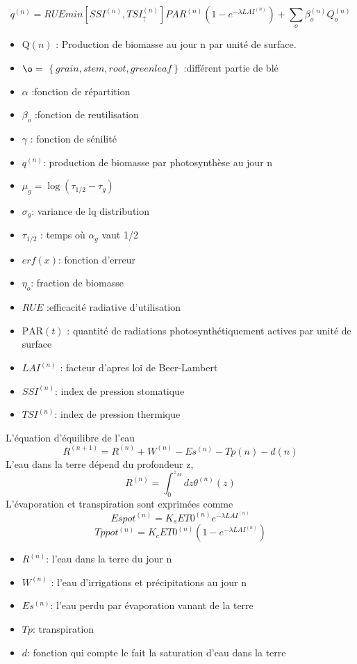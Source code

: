 \[ {q^{(n)}}=RUE min[SSI^{(n)}, TSI_\uparrow^{(n)}]PAR^{(n)}(1-e^{-\lambda LAI^{(n)}})+\sum_o \beta_o^{(n)}Q_o^{(n)} \]
\begin{itemize}
\item $\mathrm{Q}(n)$ : Production de biomasse au jour n par unité de surface.
\item $\o=$ $\left\lbrace grain, stem,root,greenleaf\right\rbrace$ :différent partie de blé
\item $\alpha$  :fonction de répartition
\item $\beta_o$  :fonction de reutilisation
\item $\gamma$ : fonction de sénilité
\item $q^{(n)}$: production de biomasse par photosynthèse au jour n 
\item $\mu_g=\log (\tau_{1/2}-\tau_g)$
\item $\sigma_g$: variance de lq distribution
\item $\tau_{1/2}$ : temps où $\alpha_g$ vaut 1/2
\item $erf(x)$: fonction d'erreur
\item $\eta_o$: fraction de biomasse 
\item $RUE$ :efficacité radiative d'utilisation 
\item $\mathrm{PAR}(t)$ : quantité de radiations photosynthétiquement actives par unité de surface
\item $LAI^{(n)}$ : facteur d'apres loi de Beer-Lambert 
\item $SSI^{(n)}$: index de pression stomatique 
\item $TSI^{(n)}$: index de pression thermique
\end{itemize}
L'équation d'équilibre de l'eau
\[ {R^{(n+1)}}=R^{(n)}+W^{(n)}-Es^{(n)}-Tp{(n)}-d{(n)}\]
L'eau dans la terre dépend du profondeur z,
\[ {R^{(n)}}=\int_0^{z_M}dz \theta^{(n)}(z) \]
L'évaporation et transpiration sont exprimées comme
\[ {Espot^{(n)}}=K_sET0^{(n)}e^{-\lambda LAI^{(n)}}\]
\[ {Tppot^{(n)}}=K_cET0^{(n)}(1-e^{-\lambda LAI^{(n)}})\]
\begin{itemize}
\item $R^{(n)}$: l'eau dans la terre du jour n
\item $W^{(n)}$ : l'eau d'irrigations et  précipitations au jour n
\item $Es^{(n)}$: l'eau perdu par évaporation vanant de la terre
\item $Tp$: transpiration
\item $d$: fonction qui compte le fait la saturation d'eau dans la terre
\end{itemize}
